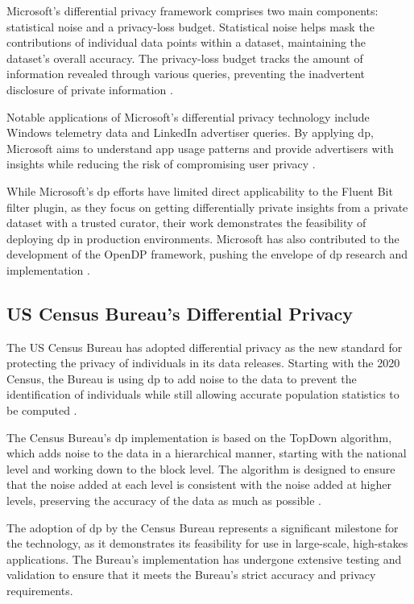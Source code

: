 Microsoft's differential privacy framework comprises two main components: statistical noise and a privacy-loss budget. Statistical noise helps mask the contributions of individual data points within a dataset, maintaining the dataset's overall accuracy. The privacy-loss budget tracks the amount of information revealed through various queries, preventing the inadvertent disclosure of private information \cite{MicrosoftDataResponsibly}.

Notable applications of Microsoft's differential privacy technology include Windows telemetry data and LinkedIn advertiser queries. By applying \acrshort{dp}, Microsoft aims to understand app usage patterns and provide advertisers with insights while reducing the risk of compromising user privacy \cite{MicrosoftDataResponsibly, ding2017collecting}.

While Microsoft's \acrshort{dp} efforts have limited direct applicability to the Fluent Bit filter plugin, as they focus on getting differentially private insights from a private dataset with a trusted curator, their work demonstrates the feasibility of deploying \acrshort{dp} in production environments. Microsoft has also contributed to the development of the OpenDP framework, pushing the envelope of \acrshort{dp} research and implementation \cite{MicrosoftSmartNoise}.

\subsection{US Census Bureau's Differential Privacy}

The US Census Bureau has adopted differential privacy as the new standard for protecting the privacy of individuals in its data releases. Starting with the 2020 Census, the Bureau is using \acrshort{dp} to add noise to the data to prevent the identification of individuals while still allowing accurate population statistics to be computed \cite{Gong2022Harnessing}.

The Census Bureau's \acrshort{dp} implementation is based on the TopDown algorithm, which adds noise to the data in a hierarchical manner, starting with the national level and working down to the block level. The algorithm is designed to ensure that the noise added at each level is consistent with the noise added at higher levels, preserving the accuracy of the data as much as possible \cite{Gong2022Harnessing}.

The adoption of \acrshort{dp} by the Census Bureau represents a significant milestone for the technology, as it demonstrates its feasibility for use in large-scale, high-stakes applications. The Bureau's implementation has undergone extensive testing and validation to ensure that it meets the Bureau's strict accuracy and privacy requirements.

